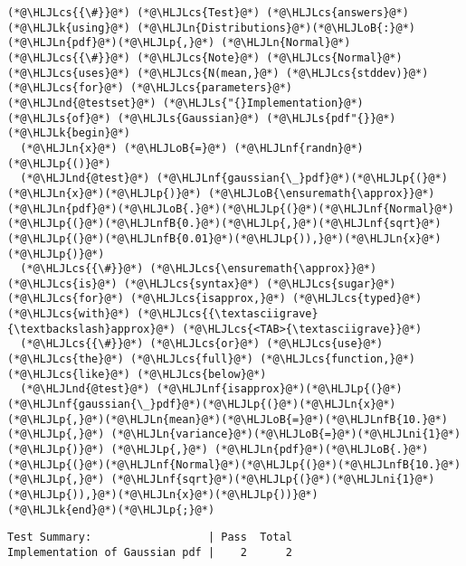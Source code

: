 \documentclass[12pt,a4paper]{article}
\newcommand{\HLJLk}[1]{\textcolor[RGB]{148,91,176}{\textbf{#1}}}
\newcommand{\HLJLn}[1]{#1}
\newcommand{\HLJLnd}[1]{\textcolor[RGB]{214,102,97}{#1}}
\newcommand{\HLJLnf}[1]{\textcolor[RGB]{66,102,213}{#1}}
\newcommand{\HLJLs}[1]{\textcolor[RGB]{201,61,57}{#1}}
\newcommand{\HLJLnfB}[1]{\textcolor[RGB]{59,151,46}{#1}}
\newcommand{\HLJLni}[1]{\textcolor[RGB]{59,151,46}{#1}}
\newcommand{\HLJLoB}[1]{\textcolor[RGB]{102,102,102}{\textbf{#1}}}
\newcommand{\HLJLp}[1]{#1}
\newcommand{\HLJLcs}[1]{\textcolor[RGB]{153,153,119}{\textit{#1}}}
\begin{document}
\begin{lstlisting}
(*@\HLJLcs{{\#}}@*) (*@\HLJLcs{Test}@*) (*@\HLJLcs{answers}@*)
(*@\HLJLk{using}@*) (*@\HLJLn{Distributions}@*)(*@\HLJLoB{:}@*) (*@\HLJLn{pdf}@*)(*@\HLJLp{,}@*) (*@\HLJLn{Normal}@*) (*@\HLJLcs{{\#}}@*) (*@\HLJLcs{Note}@*) (*@\HLJLcs{Normal}@*) (*@\HLJLcs{uses}@*) (*@\HLJLcs{N(mean,}@*) (*@\HLJLcs{stddev)}@*) (*@\HLJLcs{for}@*) (*@\HLJLcs{parameters}@*)
(*@\HLJLnd{@testset}@*) (*@\HLJLs{"{}Implementation}@*) (*@\HLJLs{of}@*) (*@\HLJLs{Gaussian}@*) (*@\HLJLs{pdf"{}}@*) (*@\HLJLk{begin}@*)
  (*@\HLJLn{x}@*) (*@\HLJLoB{=}@*) (*@\HLJLnf{randn}@*)(*@\HLJLp{()}@*)
  (*@\HLJLnd{@test}@*) (*@\HLJLnf{gaussian{\_}pdf}@*)(*@\HLJLp{(}@*)(*@\HLJLn{x}@*)(*@\HLJLp{)}@*) (*@\HLJLoB{\ensuremath{\approx}}@*) (*@\HLJLn{pdf}@*)(*@\HLJLoB{.}@*)(*@\HLJLp{(}@*)(*@\HLJLnf{Normal}@*)(*@\HLJLp{(}@*)(*@\HLJLnfB{0.}@*)(*@\HLJLp{,}@*)(*@\HLJLnf{sqrt}@*)(*@\HLJLp{(}@*)(*@\HLJLnfB{0.01}@*)(*@\HLJLp{)),}@*)(*@\HLJLn{x}@*)(*@\HLJLp{)}@*)
  (*@\HLJLcs{{\#}}@*) (*@\HLJLcs{\ensuremath{\approx}}@*) (*@\HLJLcs{is}@*) (*@\HLJLcs{syntax}@*) (*@\HLJLcs{sugar}@*) (*@\HLJLcs{for}@*) (*@\HLJLcs{isapprox,}@*) (*@\HLJLcs{typed}@*) (*@\HLJLcs{with}@*) (*@\HLJLcs{{\textasciigrave}{\textbackslash}approx}@*) (*@\HLJLcs{<TAB>{\textasciigrave}}@*)
  (*@\HLJLcs{{\#}}@*) (*@\HLJLcs{or}@*) (*@\HLJLcs{use}@*) (*@\HLJLcs{the}@*) (*@\HLJLcs{full}@*) (*@\HLJLcs{function,}@*) (*@\HLJLcs{like}@*) (*@\HLJLcs{below}@*)
  (*@\HLJLnd{@test}@*) (*@\HLJLnf{isapprox}@*)(*@\HLJLp{(}@*)(*@\HLJLnf{gaussian{\_}pdf}@*)(*@\HLJLp{(}@*)(*@\HLJLn{x}@*)(*@\HLJLp{,}@*)(*@\HLJLn{mean}@*)(*@\HLJLoB{=}@*)(*@\HLJLnfB{10.}@*)(*@\HLJLp{,}@*) (*@\HLJLn{variance}@*)(*@\HLJLoB{=}@*)(*@\HLJLni{1}@*)(*@\HLJLp{)}@*) (*@\HLJLp{,}@*) (*@\HLJLn{pdf}@*)(*@\HLJLoB{.}@*)(*@\HLJLp{(}@*)(*@\HLJLnf{Normal}@*)(*@\HLJLp{(}@*)(*@\HLJLnfB{10.}@*)(*@\HLJLp{,}@*) (*@\HLJLnf{sqrt}@*)(*@\HLJLp{(}@*)(*@\HLJLni{1}@*)(*@\HLJLp{)),}@*)(*@\HLJLn{x}@*)(*@\HLJLp{))}@*)
(*@\HLJLk{end}@*)(*@\HLJLp{;}@*)
\end{lstlisting}

\begin{lstlisting}
Test Summary:                  | Pass  Total
Implementation of Gaussian pdf |    2      2
\end{lstlisting}
\end{document}
